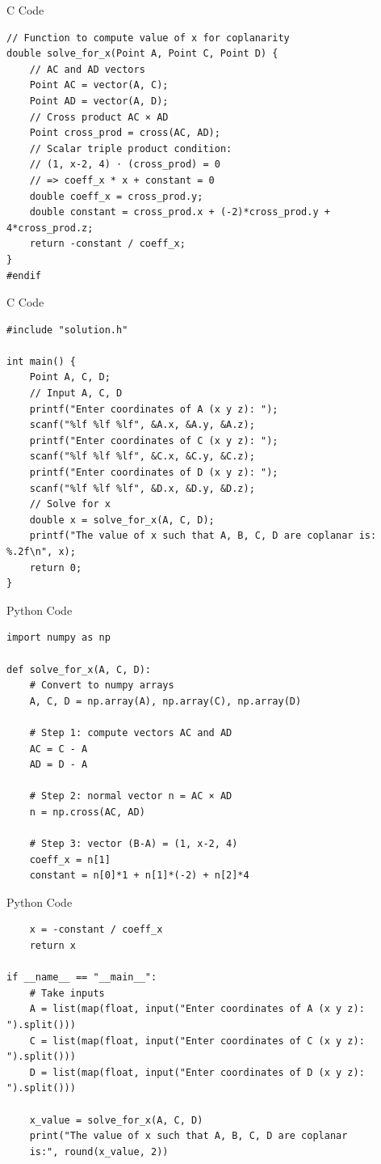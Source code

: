 \documentclass{beamer}
\begin{document}
\begin{frame}[fragile]{C Code}
    \begin{verbatim}
// Function to compute value of x for coplanarity
double solve_for_x(Point A, Point C, Point D) {
    // AC and AD vectors
    Point AC = vector(A, C);
    Point AD = vector(A, D);
    // Cross product AC × AD
    Point cross_prod = cross(AC, AD);
    // Scalar triple product condition:
    // (1, x-2, 4) ⋅ (cross_prod) = 0
    // => coeff_x * x + constant = 0
    double coeff_x = cross_prod.y;
    double constant = cross_prod.x + (-2)*cross_prod.y + 4*cross_prod.z;
    return -constant / coeff_x;
}
#endif
    \end{verbatim}
\end{frame}

\begin{frame}[fragile]{C Code}
    \begin{verbatim}
#include "solution.h"

int main() {
    Point A, C, D;
    // Input A, C, D
    printf("Enter coordinates of A (x y z): ");
    scanf("%lf %lf %lf", &A.x, &A.y, &A.z);
    printf("Enter coordinates of C (x y z): ");
    scanf("%lf %lf %lf", &C.x, &C.y, &C.z);
    printf("Enter coordinates of D (x y z): ");
    scanf("%lf %lf %lf", &D.x, &D.y, &D.z);
    // Solve for x
    double x = solve_for_x(A, C, D);
    printf("The value of x such that A, B, C, D are coplanar is: %.2f\n", x);
    return 0;
}
    \end{verbatim}
\end{frame}

\begin{frame}[fragile]{Python Code}
    \begin{verbatim}
import numpy as np

def solve_for_x(A, C, D):
    # Convert to numpy arrays
    A, C, D = np.array(A), np.array(C), np.array(D)

    # Step 1: compute vectors AC and AD
    AC = C - A
    AD = D - A

    # Step 2: normal vector n = AC × AD
    n = np.cross(AC, AD)

    # Step 3: vector (B-A) = (1, x-2, 4)
    coeff_x = n[1]
    constant = n[0]*1 + n[1]*(-2) + n[2]*4
    \end{verbatim}
\end{frame}

\begin{frame}[fragile]{Python Code}
    \begin{verbatim}
    x = -constant / coeff_x
    return x

if __name__ == "__main__":
    # Take inputs
    A = list(map(float, input("Enter coordinates of A (x y z): ").split()))
    C = list(map(float, input("Enter coordinates of C (x y z): ").split()))
    D = list(map(float, input("Enter coordinates of D (x y z): ").split()))

    x_value = solve_for_x(A, C, D)
    print("The value of x such that A, B, C, D are coplanar 
    is:", round(x_value, 2))
    \end{verbatim}
\end{frame}
\end{document}

